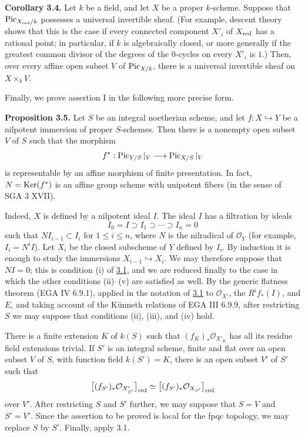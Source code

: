 \textbf{Corollary 3.4.} Let $k$ be a field, and let $X$ be a proper
$k$-scheme. Suppose that $\operatorname{Pic}_{X_{\mathrm{red}}/k}$ possesses a universal
invertible sheaf. (For example, descent theory shows that this is the case
if every connected component $X'_i$ of $X_{\mathrm{red}}$ has a rational point; in
particular, if $k$ is algebraically closed, or more generally if the greatest
common divisor of the degrees of the $0$-cycles on every $X'_i$ is $1$.)
Then, over every affine open subset $V$ of $\operatorname{Pic}_{X/k}$, there is a universal
invertible sheaf on $X\times_kV$.

Finally, we prove assertion I in the following more precise form.

\textbf{Proposition 3.5.} Let $S$ be an integral noetherian scheme, and let
$f:X\hookrightarrow Y$ be a nilpotent immersion of proper $S$-schemes.
Then there is a nonempty open subset $V$ of $S$ such that the morphism
\[
  f^*:\operatorname{Pic}_{Y/S}|_V\longrightarrow\operatorname{Pic}_{X/S}|_V
\]
is representable by an affine morphism of finite presentation. In fact,
$N=\operatorname{Ker}(f^*)$ is an affine group scheme with unipotent fibers (in the sense
of SGA 3 XVII).

Indeed, $X$ is defined by a nilpotent ideal $I$. The ideal $I$ has a
filtration by ideals
\[
  I_0=I\supset I_1\supset\cdots\supset I_n=0
\]
such that $NI_{i-1}\subset I_i$ for $1\leq i\leq n$, where $N$ is the
nilradical of $\mathcal O_Y$ (for example, $I_i=N^iI$). Let $X_i$ be the
closed subscheme of $Y$ defined by $I_i$. By induction it is enough to study
the immersions $X_{i-1}\hookrightarrow X_i$. We may therefore suppose that
$NI=0$; this is condition (i) of \hyperlink{sga6.e12.prop.3-1}{3.1}, and we are reduced finally to the case
in which the other conditions (ii)--(v) are satisfied as well. By the generic
flatness theorem (EGA IV 6.9.1), applied in the notation of \hyperlink{sga6.e12.prop.3-1}{3.1} to
$\mathcal O_{X'}$, the $R^if_*(I)$, and $E$, and taking account of the
K\"unneth relations of EGA III 6.9.9, after restricting $S$ we may suppose
that conditions (ii), (iii), and (iv) hold.

There is a finite extension $K$ of $k(S)$ such that
$(f_K)_*\mathcal O_{X'_K}$ has all its residue field extensions trivial.
If $S'$ is an integral scheme, finite and flat over an open subset $V$ of
$S$, with function field $k(S')=K$, there is an open subset $V'$ of $S'$
such that
\[
  \bigl[(f_{S'})_*\mathcal O_{X'_{S'}}\bigr]_{\mathrm{red}}
  \simeq
  \bigl[(f_{S'})_*\mathcal O_{X_{S'}}\bigr]_{\mathrm{red}}
\]
over $V'$. After restricting $S$ and $S'$ further, we may suppose that
$S=V$ and $S'=V'$. Since the assertion to be proved is local for the fpqc
topology, we may replace $S$ by $S'$. Finally, apply 3.1.

